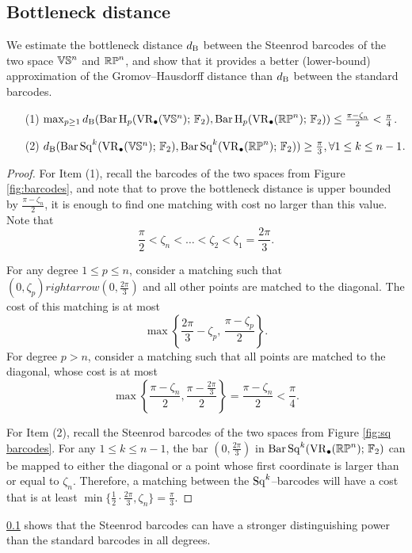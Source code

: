 \subsection{Bottleneck distance}\label{prop:db estimate}

We estimate the bottleneck distance $d_{\mathrm{B}}$ between the Steenrod barcodes of the two space $\mathbb{V}\mathbb{S}^n$ and $\mathbb{RP}^n$, and show that it provides a better (lower-bound) approximation of the Gromov--Hausdorff distance than $d_{\mathrm{B}}$ between the standard barcodes.

\medskip\theorem
\begin{itemize}
	\item[(1)] $\max_{p\geq 1}d_{\mathrm{B}}(\operatorname{Bar} \operatorname{H}_{p}(\operatorname{VR}_\bullet(\mathbb{V}\mathbb{S}^n);\,{\mathbb{F}_2}), \operatorname{Bar} \operatorname{H}_{p}(\operatorname{VR}_\bullet(\mathbb{RP}^n);\,{\mathbb{F}_2}))\leq \frac{\pi-\zeta_n}{2} < \frac{\pi}{4}$.
	\smallskip\item[(2)] $d_{\mathrm{B}}(\operatorname{Bar}\operatorname{Sq}^{k}(\operatorname{VR}_\bullet(\mathbb{V}\mathbb{S}^n);\,{\mathbb{F}_2}), \operatorname{Bar}\operatorname{Sq}^{k}(\operatorname{VR}_\bullet(\mathbb{RP}^n);\,{\mathbb{F}_2}))\geq \frac{\pi}{3},\forall 1\leq k\leq n-1$.
\end{itemize}

\begin{proof}
	For Item (1), recall the barcodes of the two spaces from Figure \ref{fig:barcodes}, and note that to prove the bottleneck distance is upper bounded by $\frac{\pi-\zeta_n}{2}$, it is enough to find one matching with cost no larger than this value.
	Note that
	\[
	\frac{\pi}{2} < \zeta_n < \dots < \zeta_2 < \zeta_1 =\frac{2\pi}{3}.
	\]
	
	For any degree $1\leq p\leq n$, consider a matching such that $(0,\zeta_p)rightarrow (0,\frac{2\pi}{3})$ and all other points are matched to the diagonal.
	The cost of this matching is at most
	\[
	\max\left\{\frac{2\pi}{3}-\zeta_p,\,\frac{\pi-\zeta_p}{2}\right\}.
	\]
	For degree $p>n$, consider a matching such that all points are matched to the diagonal, whose cost is at most
	\[
	\max\left\{\frac{\pi-\zeta_n}{2}, \frac{\pi-\frac{2\pi}{3}}{2}\right\} = \frac{\pi-\zeta_n}{2} < \frac{\pi}{4}.
	\]
	
	For Item (2), recall the Steenrod barcodes of the two spaces from Figure \ref{fig:sq barcodes}.
	For any $1\leq k\leq n-1$, the bar $(0,\frac{2\pi}{3})$ in $\operatorname{Bar}\operatorname{Sq}^{k}(\operatorname{VR}_\bullet(\mathbb{RP}^n);\,{\mathbb{F}_2})$ can be mapped to either the diagonal or a point whose first coordinate is larger than or equal to $\zeta_n$.
	Therefore, a matching between the $\operatorname{Sq}^k$--barcodes will have a cost that is at least $\min\{\frac{1}{2}\cdot\frac{2\pi}{3}, \zeta_n\} = \frac{\pi}{3}.$
\end{proof}

\cref{prop:db estimate} shows that the Steenrod barcodes can have a stronger distinguishing power than the standard barcodes in all degrees.